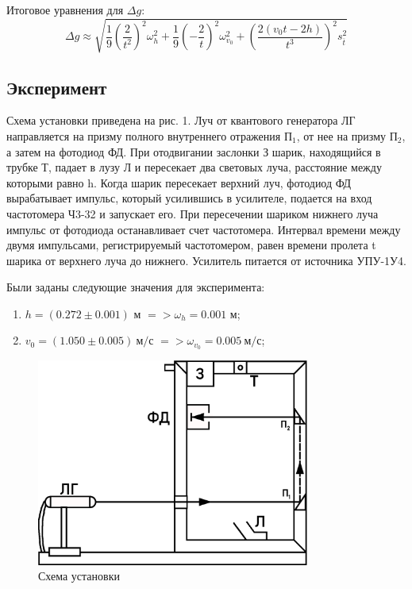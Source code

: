 Итоговое уравнения для $\Delta g$:
\begin{equation}
  \Delta g \approx \sqrt{\frac{1}{9} \left( \frac{2}{t^2} \right)^2 \omega_h^2 +\frac{1}{9} \left( -\frac{2}{t} \right)^2 \omega_{v_0}^2 + \left( \frac{2(v_0 t - 2h)}{t^3} \right)^2 s_{\overline{t}}^2}
\end{equation}

\subsection{Эксперимент}
Схема установки приведена на рис. 1. Луч от квантового генератора ЛГ направляется на призму полного внутреннего отражения П$_1$, от нее на призму П$_2$, а затем на фотодиод ФД. При отодвигании заслонки З шарик, находящийся в трубке Т, падает в лузу Л и пересекает два световых луча, расстояние между которыми равно h. Когда шарик пересекает верхний луч, фотодиод ФД вырабатывает импульс, который усилившись в усилителе, подается на вход частотомера Ч3-32 и запускает его. При пересечении шариком нижнего луча импульс от фотодиода останавливает счет частотомера. Интервал времени между двумя импульсами, регистрируемый частотомером, равен времени пролета t шарика от верхнего луча до нижнего. Усилитель питается от источника УПУ-1У4. 

Были заданы следующие значения для эксперимента:
\begin{enumerate}
    \item $h = (0.272 \pm 0.001)$ м $=> \omega_h = 0.001$ м; 
    \item $v_0 = (1.050 \pm 0.005) \ \text{м} / \text{с}$ $=> \omega_{v_{0}} = 0.005 \ \text{м} / \text{с}$;
\end{enumerate}

\begin{figure}[ht!]
\centering
\includegraphics[width=0.8\textwidth]{схема_с_лазером.eps}
\caption{Схема установки}
\label{fig:sketch}
\end{figure}

